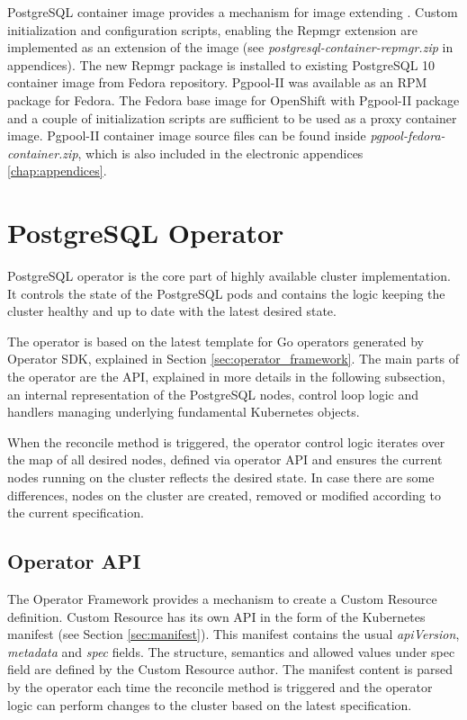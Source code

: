 \documentclass[
  digital, %
  twoside, %
  table,   %
  nolof,   %
  nolot,   %
]{fithesis3}
\begin{document}
PostgreSQL container image provides a mechanism for image extending \cite{pg_cnt_extending}. Custom initialization and configuration scripts, enabling the Repmgr extension are implemented as an extension of the image (see \textit{postgresql-container-repmgr.zip} in appendices). The new Repmgr package is installed to existing PostgreSQL 10 container image from Fedora repository.
Pgpool-II was available as an RPM package for Fedora. The Fedora base image for OpenShift with Pgpool-II package and  a couple of initialization scripts are sufficient to be used as a proxy container image. Pgpool-II container image source files can be found inside \textit{pgpool-fedora-container.zip}, which is also included in the electronic appendices \ref{chap:appendices}.

\section{PostgreSQL Operator}
PostgreSQL operator is the core part of highly available cluster implementation. It controls the state of the PostgreSQL pods and contains the logic keeping the cluster healthy and up to date with the latest desired state.

The operator is based on the latest template for Go operators generated by Operator SDK, explained in Section \ref{sec:operator_framework}. The main parts of the operator are the API, explained in more details in the following subsection, an internal representation of the PostgreSQL nodes, control loop logic and handlers managing underlying fundamental Kubernetes objects.

When the reconcile method is triggered, the operator control logic iterates over the map of all desired nodes, defined via operator API and ensures the current nodes running on the cluster reflects the desired state. In case there are some differences, nodes on the cluster are created, removed or modified according to the current specification.

\subsection{Operator API} \label{sec:operator_api}
The Operator Framework provides a mechanism to create a Custom Resource definition. Custom Resource has its own API in the form of the Kubernetes manifest (see Section \ref{sec:manifest}). This manifest contains the usual \textit{apiVersion}, \textit{metadata} and \textit{spec} fields. The structure, semantics and allowed values under spec field are defined by the Custom Resource author. The manifest content is parsed by the operator each time the reconcile method is triggered and the operator logic can perform changes to the cluster based on the latest specification.
\end{document}
